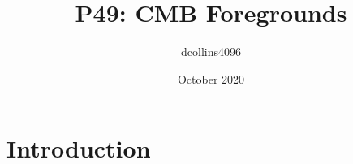 \documentclass{article}
\title{P49:  CMB Foregrounds}
\author{dcollins4096 }
\date{October 2020}
\begin{document}
\maketitle

\section{Introduction}
\end{document}
